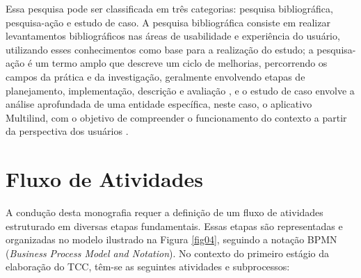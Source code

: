 Essa pesquisa pode ser classificada em três categorias: pesquisa bibliográfica, pesquisa-ação e estudo de caso. A pesquisa bibliográfica consiste em realizar levantamentos bibliográficos nas áreas de usabilidade e experiência do usuário, 
utilizando esses conhecimentos como base para a realização do estudo; a pesquisa-ação é um termo amplo que descreve um ciclo de melhorias, percorrendo os campos da prática e da investigação, geralmente envolvendo etapas de planejamento, 
implementação, descrição e avaliação \cite{tripp2005}, e o estudo de caso envolve a análise aprofundada de uma entidade específica, neste caso, o aplicativo Multilind, com o objetivo de compreender o funcionamento do contexto a partir da perspectiva 
dos usuários \cite{gerhardt2009}.

\section{Fluxo de Atividades}
\label{sec:Fluxo de Atividades}
A condução desta monografia requer a definição de um fluxo de atividades estruturado em diversas etapas fundamentais. Essas etapas são representadas e organizadas no modelo ilustrado na Figura \ref{fig04}, seguindo a notação BPMN (\textit{Business Process Model and Notation}). 
No contexto do primeiro estágio da elaboração do TCC, têm-se as seguintes atividades e subprocessos:

